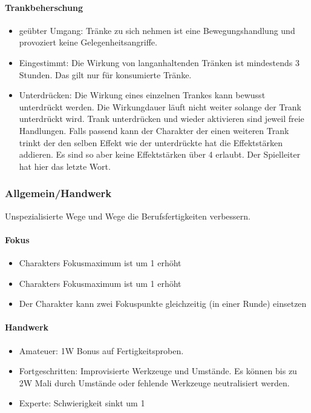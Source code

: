 \documentclass{article}
\begin{document}
\paragraph{Trankbeherschung}

\begin{itemize}
\item geübter Umgang: Tränke zu sich nehmen ist eine Bewegungshandlung und provoziert keine Gelegenheitsangriffe.
\item Eingestimmt: Die Wirkung von langanhaltenden Tränken ist mindestends 3 Stunden. Das gilt nur für konsumierte Tränke.
\item Unterdrücken: Die Wirkung eines einzelnen Trankes kann bewusst unterdrückt werden. Die Wirkungdauer läuft nicht weiter solange der Trank unterdrückt wird. Trank unterdrücken und wieder aktivieren sind jeweil freie Handlungen. Falls passend kann der Charakter der einen weiteren Trank trinkt der den selben Effekt wie der unterdrückte hat die Effektstärken addieren. Es sind so aber keine Effektstärken über 4 erlaubt. Der Spielleiter hat hier das letzte Wort.
\end{itemize}

\subsubsection{Allgemein/Handwerk}

Unspezialisierte Wege und Wege die Berufsfertigkeiten verbessern.

\paragraph{Fokus}

\begin{itemize}
\item Charakters Fokusmaximum ist um 1 erhöht
\item Charakters Fokusmaximum ist um 1 erhöht
\item Der Charakter kann zwei Fokuspunkte gleichzeitig (in einer Runde) einsetzen
\end{itemize}

\paragraph{Handwerk}

\begin{itemize}
\item Amateuer: 1W Bonus auf Fertigkeitsproben.
\item Fortgeschritten: Improvisierte Werkzeuge und Umstände. Es können bis zu 2W Mali durch Umstände oder fehlende Werkzeuge neutralisiert werden.
\item Experte: Schwierigkeit sinkt um 1
\end{itemize}
\end{document}
